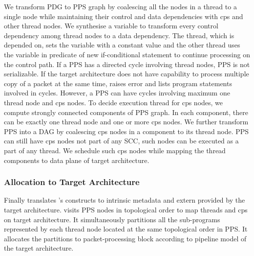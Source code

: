 \documentclass[letterpaper,twocolumn,10pt]{article}
\begin{document}
We transform PDG to PPS graph by coalescing all the nodes in a thread to a single node while maintaining their control and data dependencies with cps and other thread nodes.
We synthesise a variable to transform every control dependency among thread nodes to a data dependency.
The thread, which is depended on, sets the variable with a constant value and the other thread uses the variable in predicate of new if-conditional statement to continue processing on the control path.
If a PPS has a directed cycle involving thread nodes, PPS is not serializable.
If the target architecture does not have capability to process multiple copy of a packet at the same time, 
\ucomp raises error and lists program statements involved in cycles.
However, a PPS can have cycles involving maximum one thread node and cps nodes.
To decide execution thread for cps nodes, we compute strongly connected components of PPS graph.
In each component, there can be exactly one thread node and one or more cps nodes.
We further transform PPS into a DAG by coalescing cps nodes in a component to its thread node.
PPS can still have cps nodes not part of any SCC, such nodes can be executed as a part of any thread.
We schedule such cps nodes while mapping the thread components to data plane of target architecture.


\subsubsection{Allocation to Target Architecture}
\label{subsubsection:allocation-to-target-architecture}
Finally \ucomp translates \uarch's constructs to intrinsic metadata and extern provided by the target architecture.
\ucomp visits PPS nodes in topological order to map threads and cps on target architecture.
It simultaneously partitions all the sub-programs represented by each thread node located at the same topological order in PPS.
It allocates the partitions to packet-processing block according to pipeline model of the target architecture.
\end{document}
